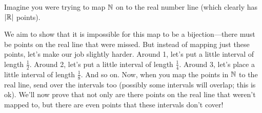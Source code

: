 \begin{proofsketch}
  Imagine you were trying to map $\mathbb N$ on to the real number line
  (which clearly has $| \mathbb R |$ points).

  \begin{tightfigure}
    \centering
    \usetikzlibrary{arrows.meta}
  \end{tightfigure}

  We aim to show that it is impossible for this map to be a
  bijection---there must be points on the real line that were missed.
  But instead of mapping just these points, let's make our job
  slightly harder. Around 1, let's put a little interval of length
  $\frac{1}{2}$. Around 2, let's put a little interval of length
  $\frac{1}{4}$. Around 3, let's place a little interval of length
  $\frac{1}{8}$. And so on. Now, when you map the points in $\mathbb N$ to
  the real line, send over the intervals too (possibly some intervals
  will overlap; this is ok). We'll now prove that not only are there
  points on the real line that weren't mapped to, but there are even
  points that these intervals don't cover!


\end{proofsketch}
